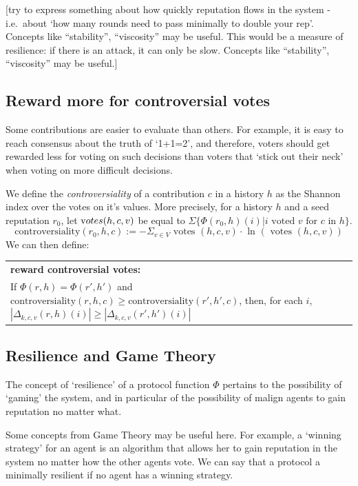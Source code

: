 \documentclass{article}
\newcommand{\flow}{\Phi}
\newenvironment{condition}[1]
	{
	\begin{center}
	   \begin{tabular}{|p{.9\textwidth}|}
		\hline \medskip
		{\bf #1:}\\
	}
	{
		\medskip \\\hline
	\end{tabular}
	\end{center}
	}
\begin{document}
[try to express something about how quickly reputation flows in the system - i.e.\ about `how many rounds need to pass minimally to double your rep'. Concepts like ``stability'', ``viscosity'' may be useful. This would be a measure of resilience: if there is an attack, it can only be slow. Concepts like ``stability'', ``viscosity'' may be useful.]


\subsection{Reward more for controversial votes}

Some contributions are easier to evaluate than others. For example, it is easy to reach consensus about the truth of `1+1=2', and therefore, voters should get rewarded less for voting on such decisions than voters that `stick out their neck' when voting on more difficult decisions.

We define the {\em controversiality} of a contribution $c$ in a history $h$ as the Shannon index over the votes on it's values. More precisely, for a history $h$ and a seed reputation $r_0$, let ${\mbox votes}(h, c, v)$ be equal to $\Sigma \{\Phi(r_0, h)(i)| i \mbox{ voted } v \mbox{ for } c \mbox{ in } h \}$.
\begin{equation}
\mbox{controversiality}(r_0, h, c) := - \Sigma_{v\in V} \mbox{ votes }(h, c, v) \cdot \mbox{ ln }(\mbox{ votes }(h, c, v))
\end{equation}
We can then define:
\begin{condition}{reward controversial votes}
If $\flow(r, h) = \flow(r', h')$ and $\mbox{controversiality}(r, h, c) \geq \mbox{controversiality}(r', h', c)$, then, for each $i$, $|\Delta_{k, c, v}(r, h)(i)| \geq |\Delta_{k, c, v}(r', h')(i)|$
\end{condition} 

\subsection{Resilience and Game Theory}

The concept of `resilience' of a protocol function $\flow$ pertains to the possibility of `gaming' the system, and in particular of the possibility of malign agents to gain reputation no matter what. 

Some concepts from Game Theory may be useful here. For example, a `winning strategy' for an agent is an algorithm that allows her to gain reputation in the system no matter how the other agents vote. We can say that a protocol a minimally resilient if no agent has a winning strategy.
\end{document}
